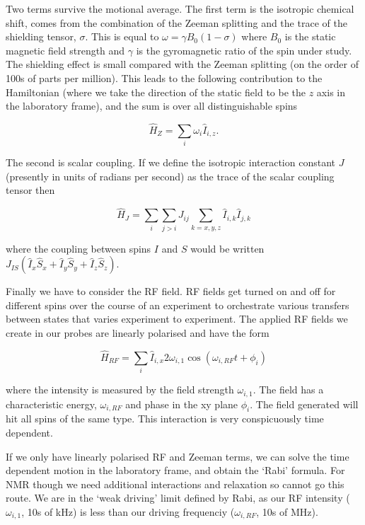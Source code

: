 \documentclass[notitlepage,11pt]{article}
\begin{document}
Two terms survive the motional average. The first term is the isotropic chemical shift, comes from the combination of the Zeeman splitting and the trace of the shielding tensor, $\sigma$. This is equal to $\omega= \gamma B_0(1-\sigma)$ where $B_0$ is the static magnetic field strength and $\gamma$ is the gyromagnetic ratio of the spin under study. The shielding effect is small compared with the Zeeman splitting (on the order of 100s of parts per million). This leads to the following contribution to the Hamiltonian (where we take the direction of the static field to be the $z$ axis in the laboratory frame), and the sum is over all distinguishable spins

\begin{equation}
\hat{H}_Z= \sum_i \omega_i \hat{I}_{i,z}.
  \end{equation}

The second is scalar coupling. If we define the isotropic interaction constant $J$ (presently in units of radians per second) as the trace of the scalar coupling tensor then 

\begin{equation}
\hat{H}_J= \sum_i\sum_{j>i} J_{ij} \sum_{k=x,y,z} \hat{I}_{i,k}\hat{I}_{j,k}
  \end{equation}

where the coupling between spins $I$ and $S$ would be written $J_{IS}(\hat{I}_x\hat{S}_x+\hat{I}_y\hat{S}_y+\hat{I}_z\hat{S}_z)$. 

Finally we have to consider the RF field. RF fields get turned on and off for different spins over the course of an experiment to orchestrate various transfers between states that varies experiment to experiment. The applied RF fields we create in our probes are linearly polarised and have the form

\begin{equation}
\hat{H}_{RF} = \sum_i \hat{I}_{i,x} 2\omega_{i,1} \cos(\omega_{i,RF}t+\phi_i)
\end{equation}

where the intensity is measured by the field strength $\omega_{i,1}$. The field has a characteristic energy, $\omega_{i,RF}$ and phase in the xy plane $\phi_i$. The field generated will hit all spins of the same type. This interaction is very conspicuously time dependent.

If we only have linearly polarised RF and Zeeman terms, we can solve the time dependent motion in the laboratory frame, and obtain the `Rabi' formula. For NMR though we need additional interactions and relaxation so cannot go this route. We are in the `weak driving' limit defined by Rabi, as our RF intensity ($\omega_{i,1}$, 10s of kHz) is less than our driving frequenciy ($\omega_{i,RF}$, 10s of MHz).
\end{document}
